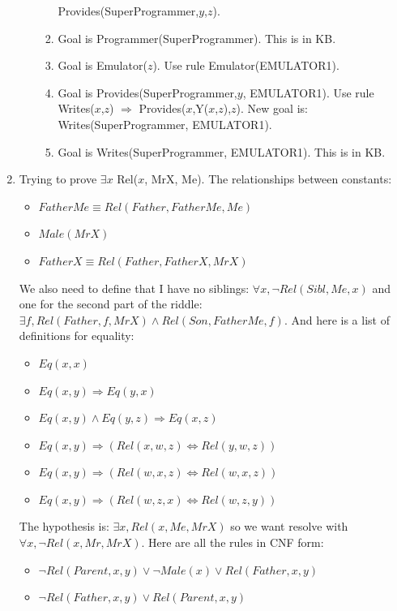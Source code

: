 \documentclass[10pt]{article}
\begin{document}
\begin{enumerate}
\begin{enumerate}
\begin{enumerate}
          Provides(SuperProgrammer,$y$,$z$).
    \item Goal is Programmer(SuperProgrammer).  This is in KB.
    \item Goal is Emulator($z$).  Use rule Emulator(EMULATOR1).
    \item Goal is Provides(SuperProgrammer,$y$, EMULATOR1).  Use
          rule \\
          Writes($x$,$z$) $\Rightarrow$ Provides($x$,Y($x$,$z$),$z$).
          New goal is: Writes(SuperProgrammer, EMULATOR1).
    \item Goal is Writes(SuperProgrammer, EMULATOR1).  This is in KB.
    \end{enumerate}
  \end{enumerate}
\item %
  Trying to prove $\exists x$ Rel($x$, MrX, Me).
  The relationships between constants:
  \begin{itemize}
  \item $FatherMe \equiv Rel(Father, FatherMe, Me)$
  \item $Male(MrX)$
  \item $FatherX \equiv Rel(Father, FatherX, MrX)$
  \end{itemize}
  We also need to define that I have no siblings: 
  $\forall x, \neg Rel(Sibl,Me,x)$ and one for the second part of the riddle:
  $\exists f, Rel(Father, f, MrX) \land Rel(Son, FatherMe, f)$.
  And here is a list of definitions for equality:
  \begin{itemize}
  \item $Eq(x,x)$
  \item $Eq(x,y) \Rightarrow Eq(y,x)$
  \item $Eq(x,y) \land Eq(y,z) \Rightarrow Eq(x,z)$
  \item $Eq(x,y) \Rightarrow (Rel(x,w,z) \Leftrightarrow Rel(y,w,z))$
  \item $Eq(x,y) \Rightarrow (Rel(w,x,z) \Leftrightarrow Rel(w,x,z))$
  \item $Eq(x,y) \Rightarrow (Rel(w,z,x) \Leftrightarrow Rel(w,z,y))$
  \end{itemize}
  The hypothesis is: $\exists x, Rel(x, Me, MrX)$ so we want resolve with
  $\forall x, \neg Rel(x, Mr, MrX)$.
  Here are all the rules in CNF form:
  \begin{itemize}
  \item $\neg Rel(Parent,x,y) \lor \neg Male(x) \lor Rel(Father,x,y)$
  \item $\neg Rel(Father,x,y) \lor Rel(Parent,x,y)$

\end{itemize}
\end{enumerate}
\end{document}
